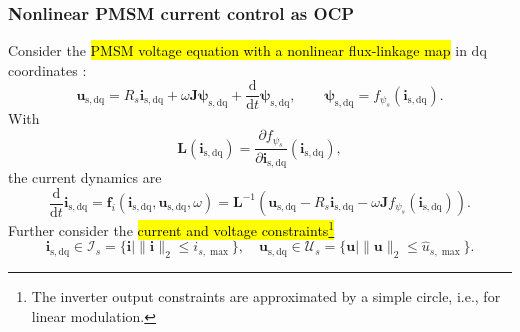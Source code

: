 \begin{frame}
	\frametitle{Nonlinear PMSM current control as OCP}
	Consider the \hl{PMSM voltage equation with a nonlinear flux-linkage map} in $\mathrm{dq}$ coordinates :
	\begin{equation*}
		\bm{u}_{\mathrm{s,dq}}=R_s\bm{i}_{\mathrm{s,dq}}
		+\omega\bm{J}\bm{\psi}_{\mathrm{s,dq}}
		+\frac{\mathrm{d}}{\mathrm{d}t}\bm{\psi}_{\mathrm{s,dq}},
		\qquad
		\bm{\psi}_{\mathrm{s,dq}}=f_{\psi_s}(\bm{i}_{\mathrm{s,dq}}).
	\end{equation*}\pause%
	With
	\begin{equation*}
		\bm{L}(\bm{i}_{\mathrm{s,dq}})
		=\frac{\partial f_{\psi_s}}{\partial \bm{i}_{\mathrm{s,dq}}}(\bm{i}_{\mathrm{s,dq}}),
	\end{equation*}\pause%
	the current dynamics are
	\begin{equation*}
		\frac{\mathrm{d}}{\mathrm{d}t}\bm{i}_{\mathrm{s,dq}}=\bm{f}_i(\bm{i}_{\mathrm{s,dq}},\bm{u}_{\mathrm{s,dq}},\omega)=\bm{L}^{-1}\!\left(\bm{u}_{\mathrm{s,dq}}-R_s\bm{i}_{\mathrm{s,dq}}
		-\omega\bm{J}f_{\psi_s}(\bm{i}_{\mathrm{s,dq}})\right).
	\end{equation*}\pause%
	Further consider the \hl{current and voltage constraints\footnote{The inverter output constraints are approximated by a simple circle, i.e., for linear modulation.}}
	\begin{equation*}
		\bm{i}_{\mathrm{s,dq}}\in\mathcal{I}_s=\{\bm{i}\mid\|\bm{i}\|_2\leq i_{s,\max}\},
		\quad
		\bm{u}_{\mathrm{s,dq}}\in\mathcal{U}_s=\{\bm{u}\mid\|\bm{u}\|_2\leq \hat{u}_{s,\max}\}.
	\end{equation*}
\end{frame}

